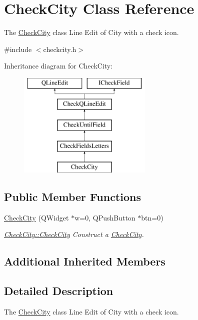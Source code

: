 \hypertarget{classCheckCity}{\section{Check\-City Class Reference}
\label{classCheckCity}
}


The \hyperlink{classCheckCity}{Check\-City} class Line Edit of City with a check icon.  




{\ttfamily \#include $<$checkcity.\-h$>$}

Inheritance diagram for Check\-City\-:\begin{figure}[H]
\begin{center}
\leavevmode
\includegraphics[height=5.000000cm]{de/de9/classCheckCity}
\end{center}
\end{figure}
\subsection*{Public Member Functions}
\begin{DoxyCompactItemize}
\item 
\hyperlink{classCheckCity_a639556875bd01b8cee5cf92759972ca5}{Check\-City} (Q\-Widget $\ast$w=0, Q\-Push\-Button $\ast$btn=0)
\begin{DoxyCompactList}\small\item\em \hyperlink{classCheckCity_a639556875bd01b8cee5cf92759972ca5}{Check\-City\-::\-Check\-City} Construct a \hyperlink{classCheckCity}{Check\-City}. \end{DoxyCompactList}\end{DoxyCompactItemize}
\subsection*{Additional Inherited Members}


\subsection{Detailed Description}
The \hyperlink{classCheckCity}{Check\-City} class Line Edit of City with a check icon. 

